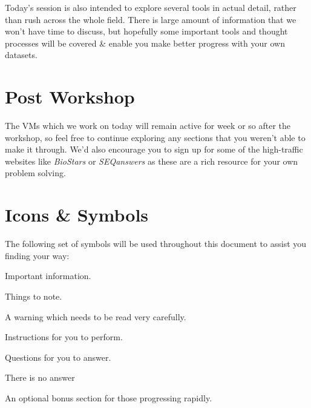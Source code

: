 Today's session is also intended to explore several tools in actual detail, rather than rush across the whole field.
There is large amount of information that we won't have time to discuss, but hopefully some important tools and thought processes will be covered \& enable you make better progress with your own datasets.\\

\section{Post Workshop}
The VMs which we work on today will remain active for week or so after the workshop, so feel free to continue exploring any sections that you weren't able to make it through.
We'd also encourage you to sign up for some of the high-traffic websites like \textit{BioStars} or \textit{SEQanswers} as these are a rich resource for your own problem solving.

\section{Icons \& Symbols}
The following set of symbols will be used throughout this document to assist you finding your way: \\

\begin{information}
Important information.\\
\end{information}

\begin{note}
Things to note.\\
\end{note}

\begin{warning}
A warning which needs to be read very carefully.\\
\end{warning}

\begin{steps}
Instructions for you to perform. \\
\end{steps}

\begin{questions}
Questions for you to answer. \\
\begin{answer}
There is no answer
\end{answer}
\end{questions}

\begin{bonus}
An optional bonus section for those progressing rapidly. \\
\end{bonus}


